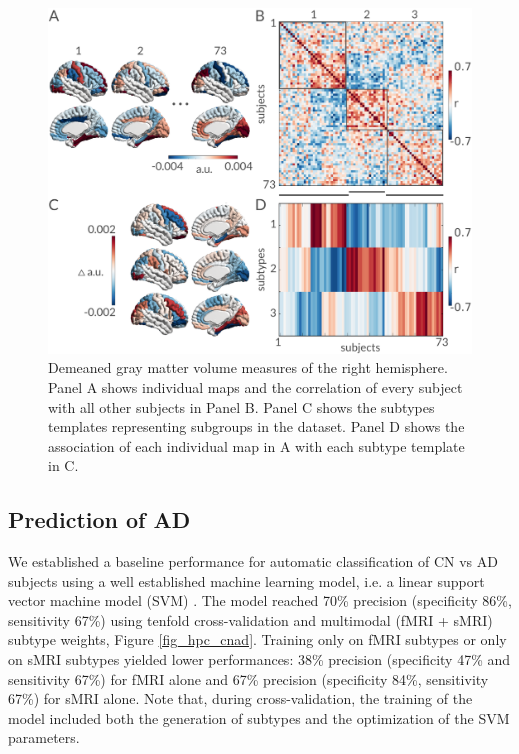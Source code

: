 \documentclass[authoryear]{elsarticle}
\begin{document}
\begin{figure}[ht]
\centering
\includegraphics[width=\linewidth]{figures/subjects_variability.png}
\caption{Demeaned gray matter volume measures of the right hemisphere. Panel A shows individual maps and the correlation of every subject with all other subjects in Panel B. Panel C shows the subtypes templates representing subgroups in the dataset. Panel D shows the association of each individual map in A with each subtype template in C.}
\label{fig_subj_var}
\end{figure}

\subsection*{Prediction of AD}
We established a baseline performance for automatic classification of CN vs AD subjects using a well established machine learning model, i.e. a linear support vector machine model (SVM) \citep{Cortes1995}. The model reached 70\% precision (specificity 86\%, sensitivity 67\%) using tenfold cross-validation and multimodal (fMRI + sMRI) subtype weights, Figure \ref{fig_hpc_cnad}. Training only on fMRI subtypes or only on sMRI subtypes yielded lower performances: 38\% precision (specificity 47\% and sensitivity 67\%) for fMRI alone and 67\% precision (specificity 84\%, sensitivity 67\%) for sMRI alone. Note that, during cross-validation, the training of the model included both the generation of subtypes and the optimization of the SVM parameters.
\end{document}
